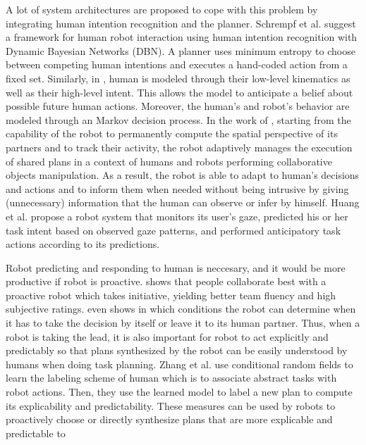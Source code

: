 A lot of system architectures are proposed to cope with this problem by integrating human intention recognition and the planner. 
Schrempf et al. \cite{schrempf2005nove} suggest a framework for human robot interaction using human intention recognition with Dynamic Bayesian Networks (DBN). A planner uses minimum entropy to choose between competing human intentions and executes a hand-coded action from a fixed set. Similarly, in \cite{koppula2016anticipatory}, human is modeled through their low-level kinematics as well as their high-level intent. This allows the model to anticipate a belief about possible future human actions. Moreover, the human’s and robot’s behavior are modeled through an Markov decision process. In  the  work  of \cite{devin2016implemented},  starting  from  the  capability  of  the  robot  to permanently compute the spatial perspective of its partners and to track their activity, the robot adaptively manages the execution of shared  plans  in  a  context  of  humans  and  robots  performing  collaborative  objects  manipulation.  As  a result,  the  robot  is  able  to adapt to human’s decisions and actions and to inform them when needed  without  being  intrusive  by  giving (unnecessary)  information that the human can observe or infer by himself. Huang et al. \cite{huang2016anticipatory} propose a robot system that monitors its user's gaze, predicted his or her task intent based on observed gaze patterns, and performed anticipatory task actions according to its predictions. 

Robot predicting and responding to human is neccesary, and it would be more productive if robot is proactive. \cite{baraglia2016initiative} shows that people collaborate best with a proactive robot which takes initiative, yielding better team fluency and high subjective ratings. \cite{devin2017decisions} even shows in which conditions the robot can determine when it has to take the decision by itself or leave it to its human partner. Thus, when a robot is taking the lead, it is also important for robot to act explicitly and predictably so that plans synthesized by the robot can be easily understood by humans when doing task planning. Zhang et al. \cite{zhang2017plan} use conditional random fields to learn the labeling scheme of human which is to associate abstract tasks with robot actions. Then, they use the learned model to label a new plan to compute its explicability and predictability. These measures can be used by robots to proactively choose or directly synthesize plans that are more explicable and predictable to 
